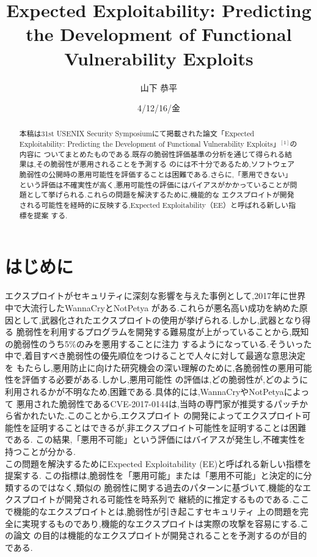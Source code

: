 \documentclass[submit,techreq,noauthor]{eco}	%
\begin{document}
\date   {4/12/16/金}				%
\title  {Expected Exploitability: Predicting the Development of Functional Vulnerability Exploits}	%
\author {山下 恭平}				%

\begin{abstract}
本稿は31st USENIX Security Symposiumにて掲載された論文「Expected Exploitability: Predicting 
the Development of Functional Vulnerability Exploits」\begin{math}^{[1]}\end{math}の内容に
ついてまとめたものである.既存の脆弱性評価基準の分析を通じて得られる結果は,その脆弱性が悪用されることを予測する
のには不十分であるため,ソフトウェア脆弱性の公開時の悪用可能性を評価することは困難である.さらに,「悪用できない」
という評価は不確実性が高く,悪用可能性の評価にはバイアスがかかっていることが問題として挙げられる.これらの問題を解決するために,機能的な
エクスプロイトが開発される可能性を経時的に反映する,Expected Exploitability（EE）と呼ばれる新しい指標を提案
する.

\end{abstract}
\maketitle

\section{はじめに}
エクスプロイトがセキュリティに深刻な影響を与えた事例として,2017年に世界中で大流行したWannaCryとNotPetya
がある.これらが悪名高い成功を納めた原因として,武器化されたエクスプロイトの使用が挙げられる.しかし,武器となり得る
脆弱性を利用するプログラムを開発する難易度が上がっていることから,既知の脆弱性のうち5\%のみを悪用することに注力
するようになっている.そういった中で,着目すべき脆弱性の優先順位をつけることで人々に対して最適な意思決定を
もたらし,悪用防止に向けた研究機会の深い理解のために,各脆弱性の悪用可能性を評価する必要がある.しかし,悪用可能性
の評価は,どの脆弱性が,どのように利用されるかが不明なため,困難である.具体的には,WannaCryやNotPetyaによって
悪用された脆弱性であるCVE-2017-0144は,当時の専門家が推奨するパッチから省かれたいた.このことから,エクスプロイト
の開発によってエクスプロイト可能性を証明することはできるが,非エクスプロイト可能性を証明することは困難である.
この結果,「悪用不可能」という評価にはバイアスが発生し,不確実性を持つことが分かる.\\
\indent この問題を解決するためにExpected Exploitability (EE)と呼ばれる新しい指標を提案する.
この指標は,脆弱性を「悪用可能」または「悪用不可能」と決定的に分類するのではなく,類似の
脆弱性に関する過去のパターンに基づいて,機能的なエクスプロイトが開発される可能性を時系列で
継続的に推定するものである.ここで機能的なエクスプロイトとは,脆弱性が引き起こすセキュリティ
上の問題を完全に実現するものであり,機能的なエクスプロイトは実際の攻撃を容易にする.この論文
の目的は機能的なエクスプロイトが開発されることを予測するのが目的である.
\end{document}
